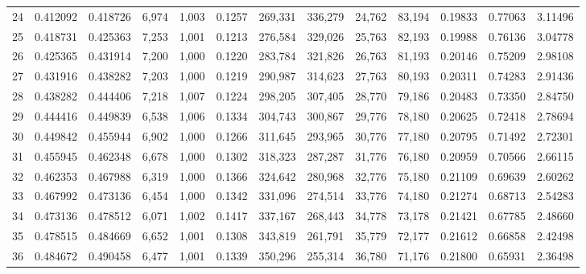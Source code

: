 \begin{tabular}{rrrrrrrrrrrrr}
24  &  0.412092 &  0.418726 &   6,974 &  1,003 &                                     0.1257 &  269,331 &  336,279 &   24,762 &   83,194 &  0.19833 &  0.77063 &  3.11496 \\
25  &  0.418731 &  0.425363 &   7,253 &  1,001 &                                     0.1213 &  276,584 &  329,026 &   25,763 &   82,193 &  0.19988 &  0.76136 &  3.04778 \\
26  &  0.425365 &  0.431914 &   7,200 &  1,000 &                                     0.1220 &  283,784 &  321,826 &   26,763 &   81,193 &  0.20146 &  0.75209 &  2.98108 \\
27  &  0.431916 &  0.438282 &   7,203 &  1,000 &                                     0.1219 &  290,987 &  314,623 &   27,763 &   80,193 &  0.20311 &  0.74283 &  2.91436 \\
28  &  0.438282 &  0.444406 &   7,218 &  1,007 &                                     0.1224 &  298,205 &  307,405 &   28,770 &   79,186 &  0.20483 &  0.73350 &  2.84750 \\
29  &  0.444416 &  0.449839 &   6,538 &  1,006 &                                     0.1334 &  304,743 &  300,867 &   29,776 &   78,180 &  0.20625 &  0.72418 &  2.78694 \\
30  &  0.449842 &  0.455944 &   6,902 &  1,000 &                                     0.1266 &  311,645 &  293,965 &   30,776 &   77,180 &  0.20795 &  0.71492 &  2.72301 \\
31  &  0.455945 &  0.462348 &   6,678 &  1,000 &                                     0.1302 &  318,323 &  287,287 &   31,776 &   76,180 &  0.20959 &  0.70566 &  2.66115 \\
32  &  0.462353 &  0.467988 &   6,319 &  1,000 &                                     0.1366 &  324,642 &  280,968 &   32,776 &   75,180 &  0.21109 &  0.69639 &  2.60262 \\
33  &  0.467992 &  0.473136 &   6,454 &  1,000 &                                     0.1342 &  331,096 &  274,514 &   33,776 &   74,180 &  0.21274 &  0.68713 &  2.54283 \\
34  &  0.473136 &  0.478512 &   6,071 &  1,002 &                                     0.1417 &  337,167 &  268,443 &   34,778 &   73,178 &  0.21421 &  0.67785 &  2.48660 \\
35  &  0.478515 &  0.484669 &   6,652 &  1,001 &                                     0.1308 &  343,819 &  261,791 &   35,779 &   72,177 &  0.21612 &  0.66858 &  2.42498 \\
36  &  0.484672 &  0.490458 &   6,477 &  1,001 &                                     0.1339 &  350,296 &  255,314 &   36,780 &   71,176 &  0.21800 &  0.65931 &  2.36498 \\

\end{tabular}
